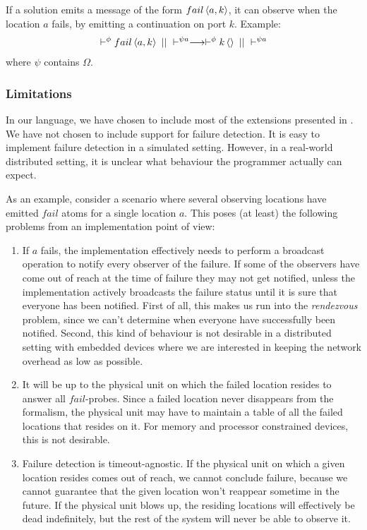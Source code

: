 If a solution emits a message of the form $\atm fail<a,k>$, it can observe
when the location $a$ fails, by emitting a continuation on port $k$. Example:
\begin{align*}
 \vdash^\phi \atm fail<a, k> ~||~ \vdash^{\psi a} \longrightarrow \vdash^\phi
 \atm k<> ~||~ \vdash^{\psi a}
\end{align*}
where $\psi$ contains $\Omega$.

\subsubsection{Limitations}

In our language, we have chosen to include most of the extensions presented in
\cite{fournet1996calculus}. We have not chosen to include support for failure
detection. It is easy to implement failure detection in a simulated setting.
However, in a real-world distributed setting, it is unclear what behaviour the
programmer actually can expect.

As an example, consider a scenario where several observing locations have
emitted $fail$ atoms for a single location $a$. This poses (at least) the
following problems from an implementation point of view:
\begin{enumerate}
 \item If $a$ fails, the implementation effectively needs to perform a broadcast
 operation to notify every observer of the failure. If some of the observers
 have come out of reach at the time of failure they may not get notified, unless
 the implementation actively broadcasts the failure status until it is sure that
 everyone has been notified. First of all, this makes us run into the
 \emph{rendezvous} problem, since we can't determine when everyone have
 successfully been notified. Second, this kind of behaviour is not desirable in
 a distributed setting with embedded devices where we are interested in keeping
 the network overhead as low as possible.

 \item It will be up to the physical unit on which the failed location resides
 to answer all $fail$-probes. Since a failed location never disappears from the
 formalism, the physical unit may have to maintain a table of all the failed
 locations that resides on it. For memory and processor constrained devices,
 this is not desirable.

 \item Failure detection is timeout-agnostic. If the physical unit on which a
 given location resides comes out of reach, we cannot conclude failure, because
 we cannot guarantee that the given location won't reappear sometime in the
 future. If the physical unit blows up, the residing locations will effectively
 be dead indefinitely, but the rest of the system will never be able to observe
 it.
\end{enumerate}

